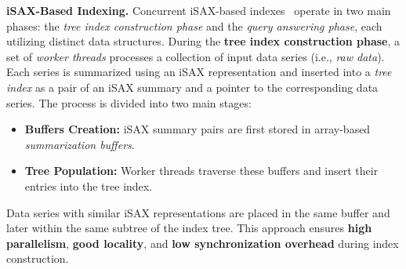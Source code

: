 \documentclass[a4paper,11pt,twoside,openany]{book}
\begin{document}
\noindent\textbf{iSAX-Based Indexing.}
Concurrent iSAX-based indexes~\cite{peng2018paris,parisplus,peng2020messi,  
PFP21-I,PFP21-II} operate in two main phases:  
the \textit{tree index construction phase} and the \textit{query answering phase},  
each utilizing distinct data structures. 
During the \textbf{tree index construction phase}, a set of \textit{worker threads}  
processes a collection of input data series (i.e., \textit{raw data}).  
Each series is summarized using an iSAX representation and inserted into a 
\textit{tree index} as a pair of an iSAX summary and a pointer to the corresponding 
data series.  
% 
The process is divided into two main stages:
\begin{itemize}
    \item \textbf{Buffers Creation:} iSAX summary pairs are first stored in array-based  
    \textit{summarization buffers}.  
    \item \textbf{Tree Population:} Worker threads traverse these buffers and insert 
    their entries into the tree index.  
\end{itemize}  
Data series with similar iSAX representations are placed in the same buffer and later  
within the same subtree of the index tree.  
This approach ensures \textbf{high parallelism}, \textbf{good locality}, and  
\textbf{low synchronization overhead} during index construction.
\end{document}
